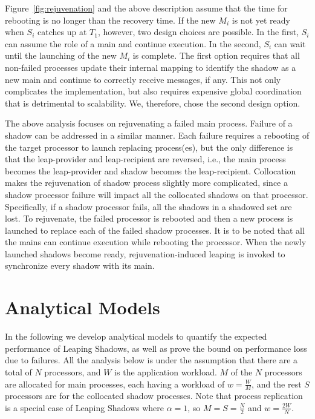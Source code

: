 Figure~\ref{fig:rejuvenation} and the above description assume that the time for rebooting is no longer than the recovery time. If the new $M_i$ is not yet ready when $S_i$ catches up at $T_1$, however, two design choices are possible. In the first, $S_i$ can assume the role of a main and continue execution. In the second, $S_i$ can wait until the launching of the new $M_i$ is complete. The first option requires that all non-failed processes update their internal mapping to identify the shadow as a new main and continue to correctly receive messages, if any. This not only complicates the implementation, but also requires expensive global coordination that is detrimental to scalability. We, therefore, chose the second design option.

The above analysis focuses on rejuvenating a failed main process. 
Failure of a shadow can be addressed in a similar manner. Each failure requires a rebooting of the target processor to launch replacing process(es), but the only difference is that the leap-provider and leap-recipient are reversed, i.e., the main process becomes the leap-provider and shadow becomes the leap-recipient. Collocation makes the rejuvenation of shadow process slightly more complicated, since a shadow processor failure will impact all the collocated shadows on that processor. Specifically, 
if a shadow processor fails, all the shadows in a shadowed set are lost. To rejuvenate, the failed processor is rebooted and then a new process is launched to replace each of the failed shadow processes. It is to be noted that all the mains can continue execution while rebooting the processor. When the newly launched shadows become ready, rejuvenation-induced leaping is invoked to synchronize every shadow with its main.




\section{Analytical Models}
\vskip -0.2in
In the following we develop analytical models to quantify the expected performance of Leaping Shadows, as well as prove the bound on performance loss due to failures. 
All the analysis below is under the assumption that there are a total of $N$ processors, and $W$ is the application workload.  
$M$ of the $N$ processors are allocated for main processes, each having a workload of $w=\frac{W}{M}$, and the rest $S$ processors are for the collocated shadow processes. %
Note that process replication is a special case of Leaping Shadows where $\alpha=1$, so 
$M=S=\frac{N}{2}$ and $w=\frac{2W}{N}$. 

